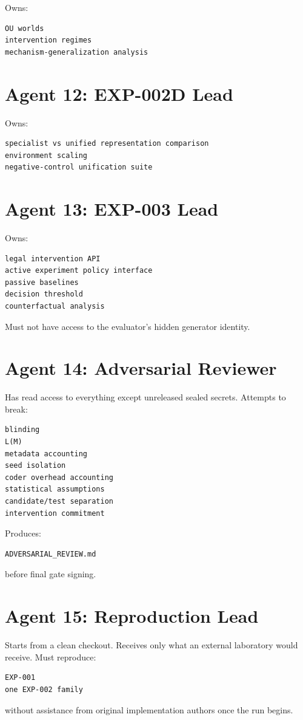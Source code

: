 \documentclass[11pt]{article}
\begin{document}
Owns:
\begin{verbatim}
OU worlds
intervention regimes
mechanism-generalization analysis
\end{verbatim}

\section{Agent 12: EXP-002D Lead}

Owns:
\begin{verbatim}
specialist vs unified representation comparison
environment scaling
negative-control unification suite
\end{verbatim}

\section{Agent 13: EXP-003 Lead}

Owns:
\begin{verbatim}
legal intervention API
active experiment policy interface
passive baselines
decision threshold
counterfactual analysis
\end{verbatim}
Must not have access to the evaluator's hidden generator identity.

\section{Agent 14: Adversarial Reviewer}

Has read access to everything except unreleased sealed secrets. Attempts to break:
\begin{verbatim}
blinding
L(M)
metadata accounting
seed isolation
coder overhead accounting
statistical assumptions
candidate/test separation
intervention commitment
\end{verbatim}
Produces:
\begin{verbatim}
ADVERSARIAL_REVIEW.md
\end{verbatim}
before final gate signing.

\section{Agent 15: Reproduction Lead}

Starts from a clean checkout. Receives only what an external laboratory would receive. Must reproduce:
\begin{verbatim}
EXP-001
one EXP-002 family
\end{verbatim}
without assistance from original implementation authors once the run begins.
\end{document}
